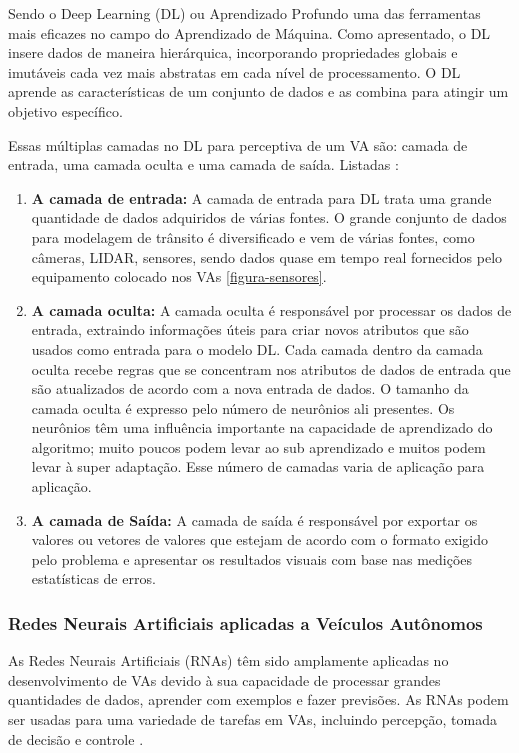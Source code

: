 Sendo o Deep Learning (DL) ou Aprendizado Profundo uma das ferramentas mais eficazes no campo do Aprendizado de Máquina. Como apresentado, o DL insere dados de maneira hierárquica, incorporando propriedades globais e imutáveis cada vez mais abstratas em cada nível de processamento. O DL aprende as características de um conjunto de dados e as combina para atingir um objetivo específico.

Essas múltiplas camadas no DL para perceptiva de um VA são: camada de entrada, uma camada oculta e uma camada de saída. Listadas \cite{software-ia}:

\begin{enumerate}
 \item \textbf{A camada de entrada:} A camada de entrada para DL trata uma grande quantidade de dados adquiridos de várias fontes. O grande conjunto de dados para modelagem de trânsito é diversificado e vem de várias fontes, como câmeras, LIDAR, sensores, sendo dados quase em tempo real fornecidos pelo equipamento colocado nos VAs \ref{figura-sensores}.
\item \textbf{A camada oculta:} A camada oculta é responsável por processar os dados de entrada, extraindo informações úteis para criar novos atributos que são usados como entrada para o modelo DL. Cada camada dentro da camada oculta recebe regras que se concentram nos atributos de dados de entrada que são atualizados de acordo com a nova entrada de dados. O tamanho da camada oculta é expresso pelo número de neurônios ali presentes. Os neurônios têm uma influência importante na capacidade de aprendizado do algoritmo; muito poucos podem levar ao sub aprendizado e muitos podem levar à super adaptação. Esse número  de camadas varia de aplicação para aplicação.
\item \textbf{A camada de Saída:} A camada de saída é responsável por exportar os valores ou vetores de valores que estejam de acordo com o formato exigido pelo problema e apresentar os resultados visuais com base nas medições estatísticas de erros.
\end{enumerate}

\subsubsection{Redes Neurais Artificiais aplicadas a Veículos Autônomos}

As Redes Neurais Artificiais (RNAs) têm sido amplamente aplicadas no desenvolvimento de VAs devido à sua capacidade de processar grandes quantidades de dados, aprender com exemplos e fazer previsões. As RNAs podem ser usadas para uma variedade de tarefas em VAs, incluindo percepção, tomada de decisão e controle \cite{sensors-yet}. 


